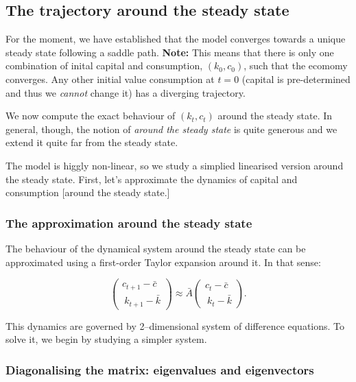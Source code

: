 \documentclass[11pt,a4paper,english]{article}
\begin{document}
\hypertarget{the-trajectory-around-the-steady-state}{%
\subsection{The trajectory around the steady
state}\label{the-trajectory-around-the-steady-state}}

For the moment, we have established that the model converges towards a
unique steady state following a saddle path. \textbf{Note:} This means
that there is only one combination of inital capital and consumption,
\((k_{0}, c_{0})\), such that the ecomomy converges. Any other initial
value consumption at \(t=0\) (capital is pre-determined and thus we
\emph{cannot} change it) has a diverging trajectory.

We now compute the exact behaviour of \((k_{t}, c_{t})\) around the
steady state. In general, though, the notion of \emph{around the steady
state} is quite generous and we extend it quite far from the steady
state.

The model is higgly non-linear, so we study a simplied linearised
version around the steady state. First, let's approximate the dynamics
of capital and consumption {[}around the steady state.{]}

\hypertarget{the-approximation-around-the-steady-state}{%
\subsubsection{The approximation around the steady
state}\label{the-approximation-around-the-steady-state}}

The behaviour of the dynamical system around the steady state can be
approximated using a first-order Taylor expansion around it. In that
sense:

\[\begin{pmatrix}
c_{t+1} - \bar{c} \\\ k_{t+1} - \bar{k}
\end{pmatrix}
\approx
\bar{A}
\begin{pmatrix}
c_{t} - \bar{c} \\\ k_{t} - \bar{k}
\end{pmatrix}.\]

This dynamics are governed by 2--dimensional system of difference
equations. To solve it, we begin by studying a simpler system.

\hypertarget{diagonalising-the-matrix-eigenvalues-and-eigenvectors}{%
\subsubsection{Diagonalising the matrix: eigenvalues and
eigenvectors}\label{diagonalising-the-matrix-eigenvalues-and-eigenvectors}}
\end{document}
